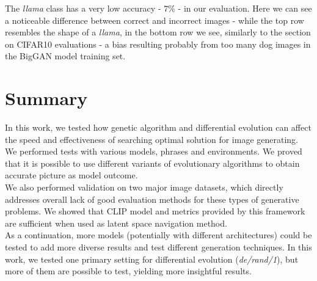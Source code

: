 \documentclass[12pt,a4paper,openany]{book}
\begin{document}
\newline
\noindent The \textit{llama} class has a very low accuracy - $7\%$ - in our evaluation. Here we can see a noticeable difference between correct and incorrect images - while the top row resembles the shape of a \textit{llama}, in the bottom row we see, similarly to the section on CIFAR10 evaluations - a bias resulting probably from too many dog images in the BigGAN model training set.

\chapter{Summary}

\noindent In this work, we tested how genetic algorithm and differential evolution can affect the speed and effectiveness of searching optimal solution for image generating. We performed tests with various models, phrases and environments. We proved that it is possible to use different variants of evolutionary algorithms to obtain accurate picture as model outcome.\\
\noindent We also performed validation on two major image datasets, which directly addresses overall lack of good evaluation methods for these types of generative problems.  We showed that CLIP model and metrics provided by this framework are sufficient when used as latent space navigation method.\\
\noindent As a continuation, more models (potentially with different architectures) could be tested to add more diverse results and test different generation techniques.  In this work, we tested one primary setting for differential evolution (\textit{de/rand/1}), but more of them are possible to test, yielding more insightful results.
\end{document}
